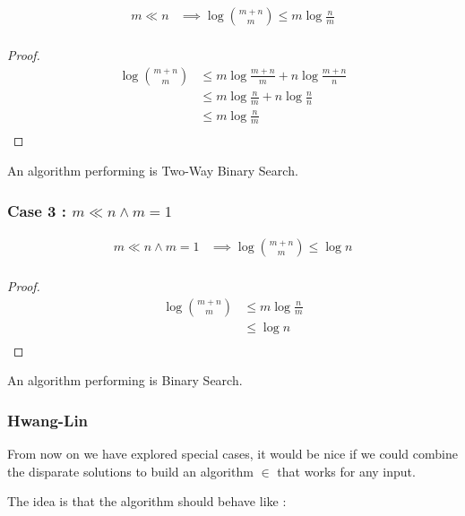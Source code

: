 \begin{lemma}
\begin{align*}
m \ll n &\implies \log\binom{m+n}{m} \leq m \log\frac{n}{m}\\
\end{align*}
\end{lemma}

\begin{proof}
\begin{align*}
\log\binom{m+n}{m} &\leq m \log\frac{m+n}{m} + n \log\frac{m+n}{n}\\
&\leq m \log\frac{n}{m} + n \log\frac{n}{n}\\
&\leq m \log\frac{n}{m}\\
\end{align*}
\end{proof}

An algorithm performing  is Two-Way Binary Search.


\subsubsection{Case 3\texorpdfstring{ : $m \ll n \land m = 1$}{}}

\begin{lemma}
\begin{align*}
m \ll n \land m = 1 &\implies \log\binom{m+n}{m} \leq \log n\\
\end{align*}
\end{lemma}

\begin{proof}
\begin{align*}
\log\binom{m+n}{m} &\leq m \log\frac{n}{m}\\
&\leq \log n\\
\end{align*}
\end{proof}

An algorithm performing  is Binary Search.

\subsubsection{Hwang-Lin}

From now on we have explored special cases, it would be nice if we could combine the disparate solutions to build an algorithm $\in$  that works for any input.

The idea is that the algorithm should behave like :

